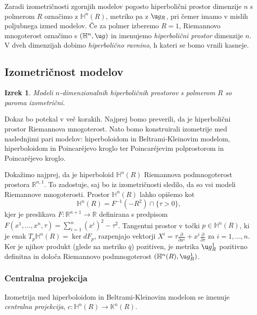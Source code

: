 \documentclass[a4paper]{article}
\newtheorem{izrek}{Izrek}
\begin{document}
Zaradi izometričnosti zgornjih modelov pogosto hiperbolični prostor dimenzije $n$ s polmerom $R$ označimo z $\mathbb{H}^{n}(R)$, metriko pa z $\u g_{R}$, pri čemer imamo v mislih poljubnega izmed modelov. Če za polmer izberemo $R=1$, Riemannovo mnogoterost označimo s $(\mathbb{H}^{n}, \u g)$ in imenujemo \emph{hiperbolični prostor} dimenzije $n$. V dveh dimenzijah dobimo \emph{hiperbolično ravnino}, h kateri se bomo vrnili kasneje.

\subsection{Izometričnost modelov}

\begin{izrek}
Modeli $n$-dimenzionalnih hiperboličnih prostorov s polmerom $R$ so paroma izometrični.
\end{izrek}

Dokaz bo potekal v več korakih. Najprej bomo preverili, da je hiperbolični prostor Riemannova mnogoterost. Nato bomo konstruirali izometrije med naslednjimi pari modelov: hiperboloidom in Beltrami-Kleinovim modelom, hiperboloidom in Poincar\'ejevo kroglo ter Poincar\'ejevim polprostorom in Poincar\'ejevo kroglo.

Dokažimo najprej, da je hiperboloid $\mathbb{H}^{n}(R)$ Riemannova podmnogoterost prostora $\mathbb{R}^{n,1}$. To zadostuje, saj bo iz izometričnosti sledilo, da so vsi modeli Riemannove mnogoterosti.
Prostor $\mathbb{H}^{n}(R)$ lahko opišemo kot 
\begin{equation}\label{eq:H^n enacba}
\mathbb{H}^{n}(R) = F^{-1}(-R^2) \cap \{ \tau>0 \},
\end{equation}
kjer je preslikava $F \colon \mathbb{R}^{n+1} \to \mathbb{R}$ definirana s predpisom $F(x^{1}, \dots , x^{n}, \tau) = \sum_{i=1}^{n} (x^{i})^2 - \tau^2$.
Tangentni prostor v točki $p \in \mathbb{H}^{n}(R)$, ki je enak $T_{p}\mathbb{H}^{n}(R) = \ker dF_{p}$, razpenjajo vektorji $X^{i} = \tau \frac{\partial}{\partial x^{i}} + x^{i} \frac{\partial}{\partial \tau}$ za $i = 1, \dots , n$. Ker je njihov produkt (glede na metriko $\bar{q}$) pozitiven, je metrika $\u g_{R}^{1}$ pozitivno definitna in določa Riemannovo podmnogoterost $(\mathbb{H}^{n}(R), \u g_{R}^{1})$. 

\subsubsection{Centralna projekcija}
Izometrija med hiperboloidom in Beltrami-Kleinovim modelom se imenuje \emph{centralna projekcija}, $c \colon \mathbb{H}^{n}(R) \to \mathbb{K}^{n}(R)$.
\end{document}
